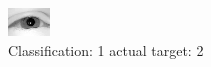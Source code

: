 \begin{figure}[h!]
\begin{center}
\includegraphics[width=0.60\columnwidth]{figures/ID2224_class_1_target_2.png}
\end{center}
\caption{ Classification: 1 actual target: 2}
\label{fig:ID2224_class_1_target_2}
\end{figure}
